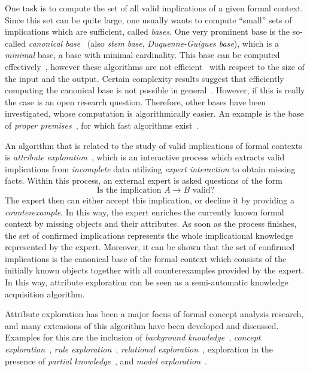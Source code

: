 One task is to compute the set of all valid implications of a given formal context.  Since
this set can be quite large, one usually wants to compute \enquote{small} sets of
implications which are sufficient, called \emph{bases}.  One very prominent base is the
so-called \emph{canonical base}~\cite{fca:DuquenneGuigues:1986} (also \emph{stem base},
\emph{Duquenne-Guigues base}), which is a \emph{minimal} base, \ie a base with minimal
cardinality.  This base can be computed
effectively~\cite{DBLP:conf/icfca/Ganter10,DBLP:journals/amai/ObiedkovD07}, however these
algorithms are not efficient~\cite{DBLP:conf/icfca/Distel10} with respect to the size of
the input and the output.  Certain complexity results suggest that efficiently computing
the canonical base is not possible in general~\cite{DBLP:journals/dam/BabinK13}.  However,
if this is really the case is an open research question.  Therefore, other bases have been
investigated, whose computation is algorithmically easier.  An example is the base of
\emph{proper premises}~\cite{fca-book}, for which fast algorithms
exist~\cite{RyDiBo-AMAI13}.

An algorithm that is related to the study of valid implications of formal contexts is
\emph{attribute exploration}~\cite{fca-book,GORS-book}, which is an interactive process
which extracts valid implications from \emph{incomplete} data utilizing \emph{expert
  interaction} to obtain missing facts.  Within this process, an external expert is asked
questions of the form
\begin{equation*}
  \text{Is the implication } A \to B \text{ valid?}
\end{equation*}
The expert then can either accept this implication, or decline it by providing a
\emph{counterexample}.  In this way, the expert enriches the currently known formal
context by missing objects and their attributes.  As soon as the process finishes, the set
of confirmed implications represents the whole implicational knowledge represented by the
expert.  Moreover, it can be shown that the set of confirmed implications is the canonical
base of the formal context which consists of the initially known objects together with all
counterexamples provided by the expert.  In this way, attribute exploration can be seen as
a semi-automatic knowledge acquisition algorithm.

Attribute exploration has been a major focus of formal concept analysis research, and many
extensions of this algorithm have been developed and discussed.  Examples for this are the
inclusion of \emph{background
  knowledge}~\cite{stumme96attribute,DBLP:journals/tcs/Ganter99}, \emph{concept
  exploration}~\cite{conf/iccs/Stumme97}, \emph{rule
  exploration}~\cite{phd/de/Zickwolff1991}, \emph{relational
  exploration}~\cite{phd/de/Rudolph2006}, exploration in the presence of \emph{partial
  knowledge}~\cite{book/fca/BurmeisterH05,conf/ijcai/BaaderGSS07}, and \emph{model
  exploration}~\cite{Diss-Felix}.

